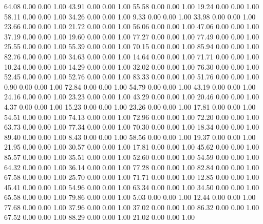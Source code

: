    64.08   0.00   0.00   1.00
   43.91   0.00   0.00   1.00
   55.58   0.00   0.00   1.00
   19.24   0.00   0.00   1.00
   58.11   0.00   0.00   1.00
   34.26   0.00   0.00   1.00
    9.33   0.00   0.00   1.00
   33.98   0.00   0.00   1.00
   23.66   0.00   0.00   1.00
   21.72   0.00   0.00   1.00
   56.06   0.00   0.00   1.00
   47.06   0.00   0.00   1.00
   37.19   0.00   0.00   1.00
   19.60   0.00   0.00   1.00
   77.27   0.00   0.00   1.00
   77.49   0.00   0.00   1.00
   25.55   0.00   0.00   1.00
   55.39   0.00   0.00   1.00
   70.15   0.00   0.00   1.00
   85.94   0.00   0.00   1.00
   82.76   0.00   0.00   1.00
   34.63   0.00   0.00   1.00
   14.64   0.00   0.00   1.00
   71.71   0.00   0.00   1.00
   10.24   0.00   0.00   1.00
   14.29   0.00   0.00   1.00
   32.02   0.00   0.00   1.00
   76.30   0.00   0.00   1.00
   52.45   0.00   0.00   1.00
   52.76   0.00   0.00   1.00
   83.33   0.00   0.00   1.00
   51.76   0.00   0.00   1.00
    0.90   0.00   0.00   1.00
   72.84   0.00   0.00   1.00
   54.79   0.00   0.00   1.00
   43.19   0.00   0.00   1.00
   24.16   0.00   0.00   1.00
   23.23   0.00   0.00   1.00
   43.29   0.00   0.00   1.00
   20.46   0.00   0.00   1.00
    4.37   0.00   0.00   1.00
   15.23   0.00   0.00   1.00
   23.26   0.00   0.00   1.00
   17.81   0.00   0.00   1.00
   54.51   0.00   0.00   1.00
   74.13   0.00   0.00   1.00
   72.96   0.00   0.00   1.00
   72.20   0.00   0.00   1.00
   63.73   0.00   0.00   1.00
   77.34   0.00   0.00   1.00
   70.30   0.00   0.00   1.00
   18.34   0.00   0.00   1.00
   89.40   0.00   0.00   1.00
    8.43   0.00   0.00   1.00
   58.56   0.00   0.00   1.00
   19.37   0.00   0.00   1.00
   21.95   0.00   0.00   1.00
   30.57   0.00   0.00   1.00
   17.81   0.00   0.00   1.00
   45.62   0.00   0.00   1.00
   85.57   0.00   0.00   1.00
   35.51   0.00   0.00   1.00
   52.60   0.00   0.00   1.00
   54.59   0.00   0.00   1.00
   64.32   0.00   0.00   1.00
   36.14   0.00   0.00   1.00
   77.28   0.00   0.00   1.00
   82.84   0.00   0.00   1.00
   67.58   0.00   0.00   1.00
   25.70   0.00   0.00   1.00
   71.71   0.00   0.00   1.00
   12.85   0.00   0.00   1.00
   45.41   0.00   0.00   1.00
   54.96   0.00   0.00   1.00
   63.34   0.00   0.00   1.00
   34.50   0.00   0.00   1.00
   65.58   0.00   0.00   1.00
   79.86   0.00   0.00   1.00
    5.03   0.00   0.00   1.00
   12.44   0.00   0.00   1.00
   77.68   0.00   0.00   1.00
   37.96   0.00   0.00   1.00
   37.02   0.00   0.00   1.00
   86.32   0.00   0.00   1.00
   67.52   0.00   0.00   1.00
   88.29   0.00   0.00   1.00
   21.02   0.00   0.00   1.00
